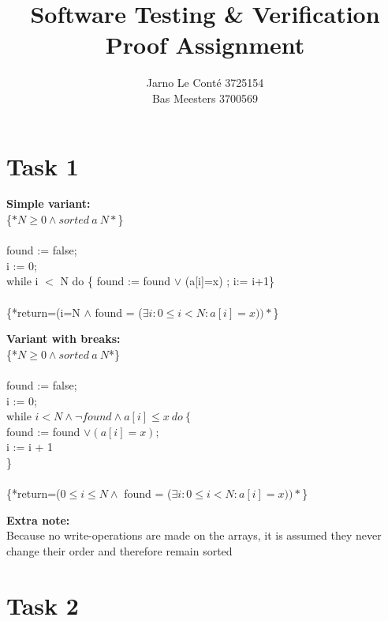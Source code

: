 \documentclass[fontsize=9p]{article}
\title{Software Testing \& Verification Proof Assignment}
\author{Jarno Le Cont\'{e} \hspace{2mm} 3725154 \\ \noindent Bas Meesters \hspace{2mm} 3700569}
\begin{document}
\maketitle
\section* {Task 1}
\textbf {Simple variant:}
\vspace {2mm} \\
\{$*N \ge 0 \wedge sorted \: a \: N *$\} \\ \\
found := false; \\
 i := 0; \\
while i $<$ N do \{ found := found $\vee$ (a[i]=x) ; i:= i+1\} \\ \\
 {\color{blue} \{*return=(i=N $\wedge$ found =  ($\exists i : 0 \le i < N : a[i] = x))*$\}}

\vspace{5 mm}
\noindent \textbf {Variant with breaks:} \\
\vspace {2 mm}
\{*$N \ge 0 \wedge sorted \: a \: N $*\} \\ \\
 found := false; \\
i := 0;\\
while $i < N \wedge \neg found \wedge a[i] \le x \:do \: \{$\\
\indent found := found $\vee (a[i]=x);$\\
\indent  i := i + 1\\
 \}\\ \\
{\color{blue} \{*return=($0 \le i \le N \wedge $ found =  ($\exists i : 0 \le i < N : a[i] = x))*$\}} 
\vspace{5 mm}

\noindent \textbf {Extra note:} \\
Because no write-operations are made on the arrays, it is assumed they never change their order and therefore remain sorted
\section* {Task 2}
\end{document}
